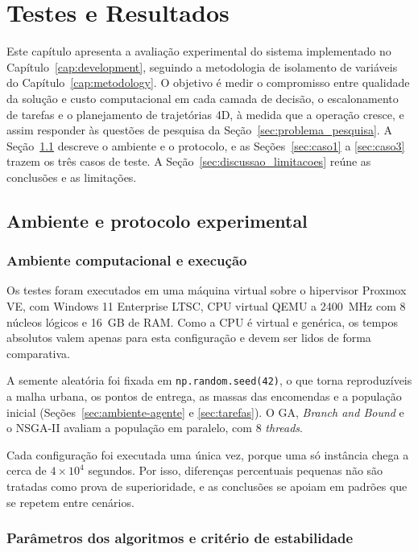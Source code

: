 \chapter{Testes e Resultados}\label{cap:test}

Este capítulo apresenta a avaliação experimental do sistema implementado no Capítulo~\ref{cap:development}, seguindo a metodologia de isolamento de variáveis do Capítulo~\ref{cap:metodology}. O objetivo é medir o compromisso entre qualidade da solução e custo computacional em cada camada de decisão, o escalonamento de tarefas e o planejamento de trajetórias 4D, à medida que a operação cresce, e assim responder às questões de pesquisa da Seção~\ref{sec:problema_pesquisa}. A Seção~\ref{sec:ambiente_protocolo} descreve o ambiente e o protocolo, e as Seções~\ref{sec:caso1} a \ref{sec:caso3} trazem os três casos de teste. A Seção~\ref{sec:discussao_limitacoes} reúne as conclusões e as limitações.

\section{Ambiente e protocolo experimental}\label{sec:ambiente_protocolo}

\subsection{Ambiente computacional e execução}

Os testes foram executados em uma máquina virtual sobre o hipervisor Proxmox VE, com Windows 11 Enterprise LTSC, CPU virtual QEMU a 2400~MHz com 8 núcleos lógicos e 16~GB de RAM. Como a CPU é virtual e genérica, os tempos absolutos valem apenas para esta configuração e devem ser lidos de forma comparativa.

A semente aleatória foi fixada em \texttt{np.random.seed(42)}, o que torna reproduzíveis a malha urbana, os pontos de entrega, as massas das encomendas e a população inicial (Seções~\ref{sec:ambiente-agente} e \ref{sec:tarefas}). O GA, \textit{Branch and Bound} e o NSGA-II avaliam a população em paralelo, com 8 \textit{threads}.

Cada configuração foi executada uma única vez, porque uma só instância chega a cerca de $4\times10^{4}$ segundos. Por isso, diferenças percentuais pequenas não são tratadas como prova de superioridade, e as conclusões se apoiam em padrões que se repetem entre cenários.

\subsection{Parâmetros dos algoritmos e critério de estabilidade}

